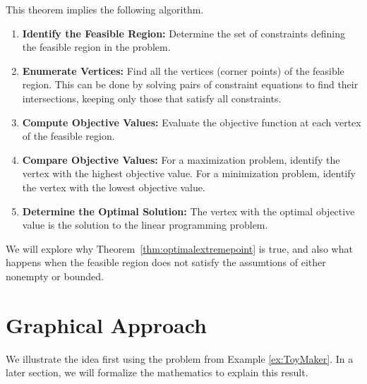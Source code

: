 This theorem implies the following algorithm.
\begin{algorithm}[H]
\caption{Enumerate Vertices Algorithm for Solving a Linear Programming Problem}
\label{alg:EnumerateVertices}
\begin{enumerate}
    \item \textbf{Identify the Feasible Region:} 
    Determine the set of constraints defining the feasible region in the problem.
    \item \textbf{Enumerate Vertices:}
    Find all the vertices (corner points) of the feasible region. This can be done by solving pairs of constraint equations to find their intersections, keeping only those that satisfy all constraints.
    \item \textbf{Compute Objective Values:} 
    Evaluate the objective function at each vertex of the feasible region.
    \item \textbf{Compare Objective Values:} 
    For a maximization problem, identify the vertex with the highest objective value. For a minimization problem, identify the vertex with the lowest objective value.
    \item \textbf{Determine the Optimal Solution:} 
    The vertex with the optimal objective value is the solution to the linear programming problem.
\end{enumerate}
\end{algorithm}


We will explore why Theorem~\ref{thm:optimalextremepoint} is true, and also what happens when the feasible region does not satisfy the assumtions of either nonempty or bounded.  


\section{Graphical Approach}
We illustrate the idea first using the problem from Example \ref{ex:ToyMaker}.  In a later section, we will formalize the mathematics to explain this result.





